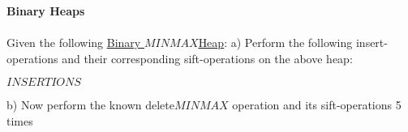 \textbf{\LARGE{\color{tumgadRed}Binary Heaps}}\\
\\
\noindent
Given the following \href{https://ossner.github.io/TUMGAD/src/DataStructures/PriorityQueues/BinaryHeaps/BinaryHeaps}{\underline{Binary $MINMAX$Heap}}:
a) Perform the following insert-operations and their corresponding sift-operations on the above heap:
\begin{center}
    $INSERTIONS$
\end{center}
b) Now perform the known delete$MINMAX$ operation and its sift-operations 5 times
